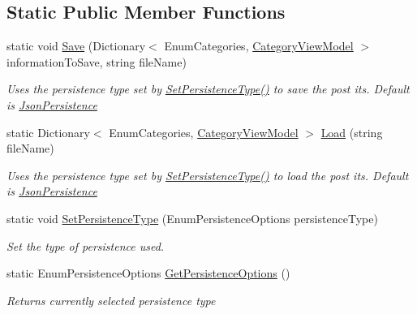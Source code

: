 \subsection*{Static Public Member Functions}
\begin{DoxyCompactItemize}
\item 
static void \hyperlink{class_kanban_board_1_1_persistence_1_1_persistence_handler_ae3128665c736adbb33e2d9645f97b1ba}{Save} (Dictionary$<$ Enum\+Categories, \hyperlink{class_kanban_board_1_1_view_model_1_1_category_view_model}{Category\+View\+Model} $>$ information\+To\+Save, string file\+Name)
\begin{DoxyCompactList}\small\item\em Uses the persistence type set by \hyperlink{class_kanban_board_1_1_persistence_1_1_persistence_handler_a3fd5c28d09ade9618010f89167b72a86}{Set\+Persistence\+Type()} to save the post its. Default is \hyperlink{class_kanban_board_1_1_persistence_1_1_persistence_handler_1_1_json_persistence}{Json\+Persistence} \end{DoxyCompactList}\item 
static Dictionary$<$ Enum\+Categories, \hyperlink{class_kanban_board_1_1_view_model_1_1_category_view_model}{Category\+View\+Model} $>$ \hyperlink{class_kanban_board_1_1_persistence_1_1_persistence_handler_a0401af2501b53fdbe0645ea36d4d25ce}{Load} (string file\+Name)
\begin{DoxyCompactList}\small\item\em Uses the persistence type set by \hyperlink{class_kanban_board_1_1_persistence_1_1_persistence_handler_a3fd5c28d09ade9618010f89167b72a86}{Set\+Persistence\+Type()} to load the post its. Default is \hyperlink{class_kanban_board_1_1_persistence_1_1_persistence_handler_1_1_json_persistence}{Json\+Persistence} \end{DoxyCompactList}\item 
static void \hyperlink{class_kanban_board_1_1_persistence_1_1_persistence_handler_a3fd5c28d09ade9618010f89167b72a86}{Set\+Persistence\+Type} (Enum\+Persistence\+Options persistence\+Type)
\begin{DoxyCompactList}\small\item\em Set the type of persistence used. \end{DoxyCompactList}\item 
static Enum\+Persistence\+Options \hyperlink{class_kanban_board_1_1_persistence_1_1_persistence_handler_a5ac8e076f0238a233f6a0cee5190b01a}{Get\+Persistence\+Options} ()
\begin{DoxyCompactList}\small\item\em Returns currently selected persistence type \end{DoxyCompactList}\end{DoxyCompactItemize}

